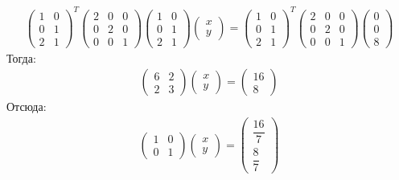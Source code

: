 \documentclass[11pt,a4paper]{report}
\begin{document}
\begin{gather*}
\begin{pmatrix} 1&0\\0&1\\2&1 \end{pmatrix}^T\begin{pmatrix} 2&0&0\\0&2&0\\0&0&1 \end{pmatrix}\begin{pmatrix} 1&0\\0&1\\2&1 \end{pmatrix}\begin{pmatrix} x\\y \end{pmatrix}=\begin{pmatrix} 1&0\\0&1\\2&1 \end{pmatrix}^T\begin{pmatrix} 2&0&0\\0&2&0\\0&0&1 \end{pmatrix}\begin{pmatrix} 0\\0\\8 \end{pmatrix}
\end{gather*}
Тогда:  
\begin{gather*}
\begin{pmatrix} 6&2\\2&3 \end{pmatrix}\begin{pmatrix} x\\y \end{pmatrix}=\begin{pmatrix} 16\\8 \end{pmatrix}
\end{gather*}
Отсюда:
\begin{gather*}
\begin{pmatrix} 1&0\\0&1 \end{pmatrix}\begin{pmatrix} x\\y \end{pmatrix}=\begin{pmatrix} \dfrac{16}{7}\\[2ex]\dfrac{8}{7} \end{pmatrix}
\end{gather*}
\end{document}
